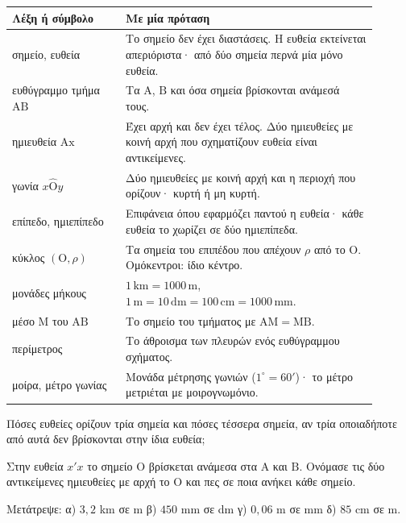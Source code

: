 

\renewcommand{\arraystretch}{1.25}
\begin{longtable}{@{}>{\raggedright\arraybackslash}p{0.28\linewidth} >{\raggedright\arraybackslash}p{0.62\linewidth}@{}}
\toprule
\textbf{Λέξη ή σύμβολο} & \textbf{Με μία πρόταση}\\
\midrule
\endhead
σημείο, ευθεία & Το σημείο δεν έχει διαστάσεις. Η ευθεία εκτείνεται απεριόριστα· από δύο σημεία περνά μία μόνο ευθεία.\\
ευθύγραμμο τμήμα $\mathrm{ΑΒ}$ & Τα $\mathrm{Α}$, $\mathrm{Β}$ και όσα σημεία βρίσκονται ανάμεσά τους.\\
ημιευθεία $\mathrm{Αx}$ & Έχει αρχή και δεν έχει τέλος. Δύο ημιευθείες με κοινή αρχή που σχηματίζουν ευθεία είναι αντικείμενες.\\
γωνία $x\hat{\mathrm{Ο}}y$ & Δύο ημιευθείες με κοινή αρχή και η περιοχή που ορίζουν· κυρτή ή μη κυρτή.\\
επίπεδο, ημιεπίπεδο & Επιφάνεια όπου εφαρμόζει παντού η ευθεία· κάθε ευθεία το χωρίζει σε δύο ημιεπίπεδα.\\
κύκλος $(\mathrm{Ο},\rho)$ & Τα σημεία του επιπέδου που απέχουν $\rho$ από το $\mathrm{Ο}$. Ομόκεντροι: ίδιο κέντρο.\\
μονάδες μήκους & $1\,\text{km}=1000\,\text{m}$, $1\,\text{m}=10\,\text{dm}=100\,\text{cm}=1000\,\text{mm}$.\\
μέσο $\mathrm{Μ}$ του $\mathrm{ΑΒ}$ & Το σημείο του τμήματος με $\mathrm{ΑΜ}=\mathrm{ΜΒ}$.\\
περίμετρος & Το άθροισμα των πλευρών ενός ευθύγραμμου σχήματος.\\
μοίρα, μέτρο γωνίας & Μονάδα μέτρησης γωνιών ($1^\circ=60'$)· το μέτρο μετριέται με μοιρογνωμόνιο.\\
\bottomrule
\end{longtable}


\ex Πόσες ευθείες ορίζουν τρία σημεία και πόσες τέσσερα σημεία, αν τρία οποιαδήποτε από αυτά δεν βρίσκονται στην ίδια ευθεία;

\ex Στην ευθεία $x'x$ το σημείο $\mathrm{Ο}$ βρίσκεται ανάμεσα στα $\mathrm{Α}$ και $\mathrm{Β}$. Ονόμασε τις δύο αντικείμενες ημιευθείες με αρχή το $\mathrm{Ο}$ και πες σε ποια ανήκει κάθε σημείο.

\ex Μετάτρεψε: α) $3{,}2$ km σε m \quad β) $450$ mm σε dm \quad γ) $0{,}06$ m σε mm \quad δ) $85$ cm σε m.

